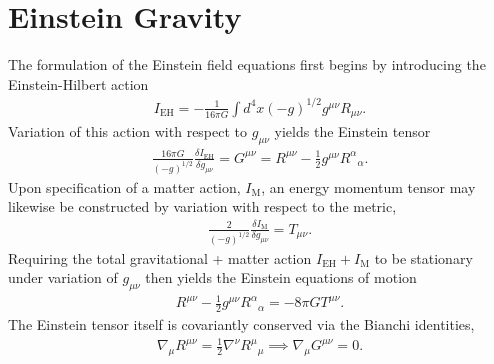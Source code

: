 \section{Einstein Gravity}
\label{s:einstein_gravity}
The formulation of the Einstein field equations first begins by introducing the Einstein-Hilbert action \cite{weinberg_1972}
\begin{eqnarray}
I_{\text{EH}} = -\frac{1}{16\pi G} \int d^4x (-g)^{1/2}  g^{\mu\nu}R_{\mu\nu}.
\end{eqnarray}
Variation of this action with respect to $g_{\mu\nu}$ yields the Einstein tensor
\begin{eqnarray}
\frac{16\pi G}{(-g)^{1/2}} \frac{\delta I_{\text{EH}}}{\delta g_{\mu\nu}}= G^{\mu\nu} = R^{\mu\nu} - \frac{1}{2}g^{\mu\nu}R^\alpha{}_\alpha.
\label{Eintensor}
\end{eqnarray}
Upon specification of a matter action, $I_\text{M}$, an energy momentum tensor may likewise be constructed by variation with respect to the metric,
\begin{eqnarray}
\frac{2}{(-g)^{1/2}} \frac{ \delta I_\text{M}}{\delta g_{\mu\nu}} = T_{\mu\nu}. 
\end{eqnarray}
Requiring the total gravitational + matter action $I_{\text{EH}}+I_\text{M}$ to be stationary under variation of $g_{\mu\nu}$ then yields the Einstein equations of motion
\begin{eqnarray}
R^{\mu\nu} - \frac{1}{2}g^{\mu\nu}R^\alpha{}_\alpha = -8\pi G T^{\mu\nu}.
\label{EinEOM}
\end{eqnarray}
The Einstein tensor itself is covariantly conserved via the Bianchi identities,
\begin{eqnarray}
\nabla_\mu R^{\mu\nu} = \frac{1}{2}\nabla^\nu R^\mu{}_\mu \implies \nabla_\mu G^{\mu\nu} = 0.
\end{eqnarray}

